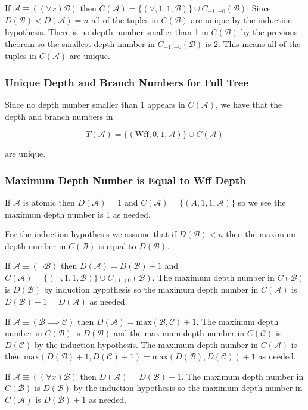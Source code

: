 \documentclass[12pt]{article}
\newcommand{\mc}[1]{\mathcal{#1}}
\begin{document}
If $\mc{A} \equiv ((\forall x)\mc{B})$ then $C(\mc{A}) = \{(\forall, 1, 1, \mc{B})\} \cup C_{+1, +0}(\mc{B})$. Since $D(\mc{B}) < D(\mc{A}) = n$ all of the tuples in $C(\mc{B})$ are unique by the induction hypothesis. There is no depth number smaller than 1 in $C(\mc{B})$ by the previous theorem so the smallest depth number in $C_{+1, +0}(\mc{B})$ is 2. This means all of the tuples in $C(\mc{A})$ are unique.

\subsubsection{Unique Depth and Branch Numbers for Full Tree}

Since no depth number smaller than 1 appears in $C(\mc{A})$, we have that the depth and branch numbers in 

$$
T(\mc{A}) = \{(\text{Wff}, 0, 1, \mc{A})\} \cup C(\mc{A})
$$

are unique.


\subsubsection{Maximum Depth Number is Equal to Wff Depth}

If $\mc{A}$ is atomic then $D(\mc{A}) = 1$ and $C(\mc{A}) = \{(A, 1, 1, \mc{A})\}$ so we see the maximum depth number is 1 as needed.

For the induction hypothesis we assume that if $D(\mc{B}) < n$ then the maximum depth number in $C(\mc{B})$ is equal to $D(\mc{B})$.

If $\mc{A} \equiv (\lnot \mc{B})$ then $D(\mc{A}) = D(\mc{B}) + 1$ and $C(\mc{A}) = \{(\lnot, 1, 1, \mc{B})\} \cup C_{+1, +0}(\mc{B})$. The maximum depth number in $C(\mc{B})$ is $D(\mc{B})$ by induction hypothesis so the maximum depth number in $C(\mc{A})$ is $D(\mc{B}) + 1 = D(\mc{A})$ as needed.

If $\mc{A} \equiv (\mc{B} \implies \mc{C})$ then $D(\mc{A}) = \text{max}(\mc{B}, \mc{C}) + 1$. The maximum depth number in $C(\mc{B})$ is $D(\mc{B})$ and the maximum depth number in $C(\mc{C})$ is $D(\mc{C})$ by the induction hypothesis. The maximum depth number in $C(\mc{A})$ is then $\text{max}(D(\mc{B}) + 1, D(\mc{C})+1) = \text{max}(D(\mc{B}), D(\mc{C})) + 1$ as needed.

If $\mc{A} \equiv ((\forall x)\mc{B})$ then $D(\mc{A}) = D(\mc{B}) + 1$. The maximum depth number in $C(\mc{B})$ is $D(\mc{B})$ by the induction hypothesis so the maximum depth number in $C(\mc{A})$ is $D(\mc{B}) + 1$ as needed.
\end{document}
